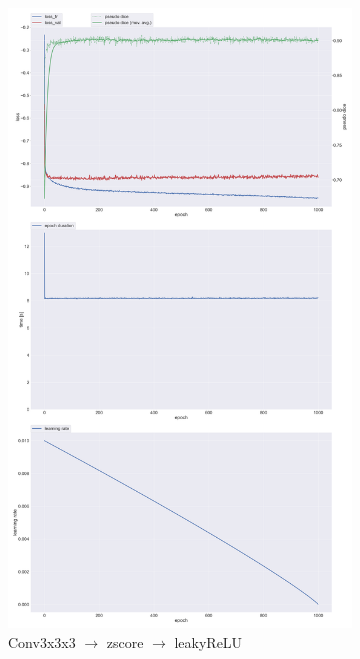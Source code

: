 \documentclass{article}
\begin{document}
\begin{figure}
  \centering
  \begin{subfigure}{0.49\textwidth}
    \includegraphics[width=\textwidth]{./figs/normreluprogress.png}
    \caption{Conv3x3x3 \(\rightarrow\) zscore \(\rightarrow\) leakyReLU}
    \label{progressa}
  \end{subfigure}
  \begin{subfigure}{0.49\textwidth}

\end{subfigure}
\end{figure}
\end{document}
